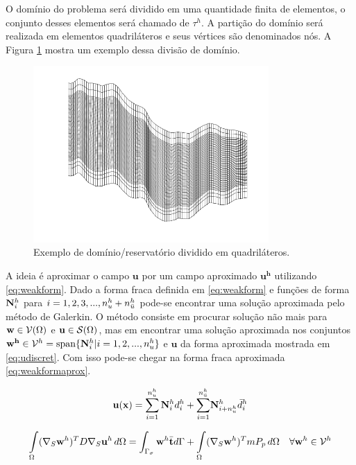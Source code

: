 O domínio do problema será dividido em uma quantidade finita de elementos, o conjunto desses elementos será chamado de $\tau^h$.  A partição do domínio será realizada em elementos quadriláteros e seus vértices são denominados nós. A Figura \ref{fig:elemento} mostra um exemplo dessa divisão de domínio.

\begin{figure}[!htbp]
\centering
\includegraphics[width=0.8\textwidth]{chap01/figs/exemplo_dominio.png}
\caption{Exemplo de domínio/reservatório dividido em quadriláteros.}
\label{fig:elemento}
\end{figure}


A ideia é aproximar o campo $\mathbf{u}$ por um campo aproximado $\mathbf{u^h}$ utilizando \eqref{eq:weakform}. Dado a forma fraca definida em \eqref{eq:weakform} e funções de forma ${\mathbf{N}_{i}^h}$ para $i = 1, 2, 3, ..., n_u^h + n_{\bar{u}}^h$ pode-se encontrar uma solução aproximada pelo método de Galerkin. O método consiste em procurar solução não mais para $\mathbf{w} \in \mathcal{V}(\Omega)$ e $\mathbf{u} \in \mathcal{S}(\Omega)$, mas em encontrar uma solução aproximada nos conjuntos  $\mathbf{w^h} \in \mathcal{V}^h = \text{span}\{ {\mathbf{N}_{i}^h} | i = 1,2, ..., n_u^h  \}$ e $\mathbf{u}$ da forma aproximada mostrada em \eqref{eq:udiscret}. Com isso pode-se chegar na forma fraca aproximada \eqref{eq:weakformaprox}.


\begin{equation}\label{eq:udiscret}
\mathbf{u}(\mathbf{x}) = \sum_{i=1}^{n_u^h} {\mathbf{N}_{i}^h}  d_i^h + {\sum_{i=1}^ {n^h_{\bar{u}}}}  \mathbf{N}_{i+n_u^h}^h \bar{d}_i^h
\end{equation}


\begin{equation}\label{eq:weakformaprox}
\int\limits_{\Omega}  (\nabla_S \mathbf{w}^h)^T D \nabla_S  \mathbf{u}^h \, d\Omega  =  \int_{\Gamma_\sigma} \mathbf{w}^h \bar{\mathbf{t}} d\Gamma  +  \int\limits_{\Omega} (\nabla_S\mathbf{w}^h)^T m P_p \, d\Omega  \quad \forall \mathbf{w}^h \in \mathcal{V}^h
\end{equation}

